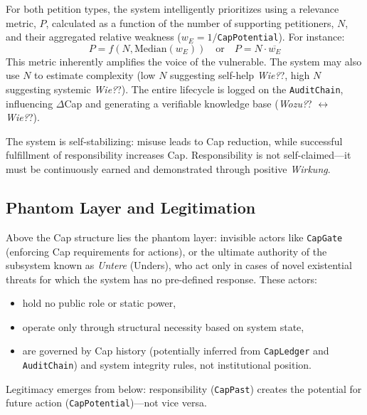 \documentclass[12pt, a4paper]{scrartcl}
\newcommand{\DeltaCap}{$\Delta$Cap}                    %
\newcommand{\CapPotential}{\texttt{CapPotential}}    %
\newcommand{\CapPast}{\texttt{CapPast}}              %
\newcommand{\CapLedger}{\texttt{CapLedger}}          %
\newcommand{\Wirkung}{\textit{Wirkung}}                 %
\newcommand{\CapGate}{\texttt{CapGate}}
\newcommand{\AuditChain}{\texttt{AuditChain}}
\newcommand{\Wozu}{\textit{Wozu?}}                      %
\newcommand{\Wie}{\textit{Wie?}}                        %
\begin{document}
\begin{itemize}
\begin{enumerate}[label=(\alph*)]
        \end{enumerate}
    For both petition types, the system intelligently prioritizes using a relevance metric, $P$, calculated as a function of the number of supporting petitioners, $N$, and their aggregated relative weakness ($w_E = 1/$\CapPotential{}). For instance:
    \[ P = f(N, \text{Median}(w_E)) \quad \text{or} \quad P = N \cdot \overline{w_E} \]
    This metric inherently amplifies the voice of the vulnerable. The system may also use $N$ to estimate complexity (low $N$ suggesting self-help \Wie?, high $N$ suggesting systemic \Wie?). The entire lifecycle is logged on the \AuditChain{}, influencing \DeltaCap{} and generating a verifiable knowledge base (\Wozu? $\leftrightarrow$ \Wie?).
\end{itemize}
The system is self-stabilizing: misuse leads to Cap reduction, while successful fulfillment of responsibility increases Cap. Responsibility is not self-claimed—it must be continuously earned and demonstrated through positive \Wirkung{}.

\subsection{Phantom Layer and Legitimation}
Above the Cap structure lies the phantom layer: invisible actors like \CapGate{} (enforcing Cap requirements for actions), or the ultimate authority of the subsystem known as \emph{Untere} (Unders), who act only in cases of novel existential threats for which the system has no pre-defined response. These actors:
\begin{itemize}
    \item hold no public role or static power,
    \item operate only through structural necessity based on system state,
    \item are governed by Cap history (potentially inferred from \CapLedger{} and \AuditChain{}) and system integrity rules, not institutional position. %
\end{itemize}
Legitimacy emerges from below: responsibility (\CapPast{}) creates the potential for future action (\CapPotential{})—not vice versa. 
\end{document}
